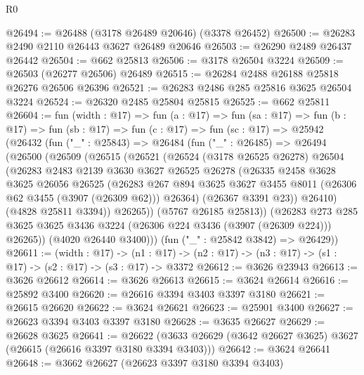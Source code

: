 \begin{lexlean}{R0}
\begin{coremodule}
@26494 := @26488 (@3178 @26489 @20646) (@3378 @26452)
@26500 := @26283 @2490 @2110 @26443 @3627 @26489 @20646
@26503 := @26290 @2489 @26437 @26442
@26504 := @662 @25813
@26506 := @3178 @26504 @3224
@26509 := @26503 (@26277 @26506) @26489
@26515 := @26284 @2488 @26188 @25818 @26276 @26506 @26396
@26521 := @26283 @2486 @285 @25816 @3625 @26504 @3224
@26524 := @26320 @2485 @25804 @25815
@26525 := @662 @25811
@26604 := fun (width : @17) =>
  fun (a : @17) =>
  fun (sa : @17) =>
  fun (b : @17) =>
  fun (sb : @17) =>
  fun (c : @17) =>
  fun (sc : @17) =>
  @25942
    (@26432
      (fun ("_" : @25843) =>
      @26484
        (fun ("_" : @26485) =>
        @26494
          (@26500
            (@26509
              (@26515
                (@26521
                  (@26524
                    (@3178 @26525 @26278)
                    @26504
                    (@26283
                      @2483
                      @2139
                      @3630
                      @3627
                      @26525
                      @26278
                      (@26335
                        @2458
                        @3628
                        @3625
                        @26056
                        @26525
                        (@26283
                          @267
                          @894
                          @3625
                          @3627
                          @3455
                          @8011
                          (@26306 @62 @3455 (@3907 (@26309 @62)))
                          @26364)
                        (@26367 @3391 @23))
                      @26410)
                    (@4828 @25811 @3394))
                  @26265))
              (@5767 @26185 @25813))
            (@26283
              @273
              @285
              @3625
              @3625
              @3436
              @3224
              (@26306 @224 @3436 (@3907 (@26309 @224)))
              @26265))
          (@4020 @26440 @3400)))
      (fun ("_" : @25842 @3842) => @26429))
@26611 := (width : @17) ->
  (n1 : @17) -> (n2 : @17) -> (n3 : @17) -> (s1 : @17) -> (s2 : @17) -> (s3 : @17) -> @3372
@26612 := @3626 @23943
@26613 := @3626 @26612
@26614 := @3626 @26613
@26615 := @3624 @26614
@26616 := @25892 @3400
@26620 := @26616 @3394 @3403 @3397 @3180
@26621 := @26615 @26620
@26622 := @3624 @26621
@26623 := @25901 @3400
@26627 := @26623 @3394 @3403 @3397 @3180
@26628 := @3635 @26627
@26629 := @26628 @3625
@26641 := @26622 (@3633 @26629 (@3642 @26627 @3625) @3627 (@26615 (@26616 @3397 @3180 @3394 @3403)))
@26642 := @3624 @26641
@26648 := @3662 @26627 (@26623 @3397 @3180 @3394 @3403)

\end{coremodule}
\end{lexlean}
